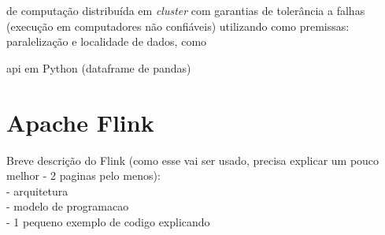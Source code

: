 de computação distribuída em \emph{cluster} com garantias de tolerância a falhas
(execução em computadores não confiáveis) utilizando como premissas: paralelização
e localidade de dados, como 

api em Python (dataframe de pandas)


\section{Apache Flink}

Breve descrição do Flink (como esse vai ser usado, precisa explicar um pouco melhor - 2 paginas pelo menos):\\
- arquitetura\\
- modelo de programacao\\
- 1 pequeno exemplo de codigo explicando


